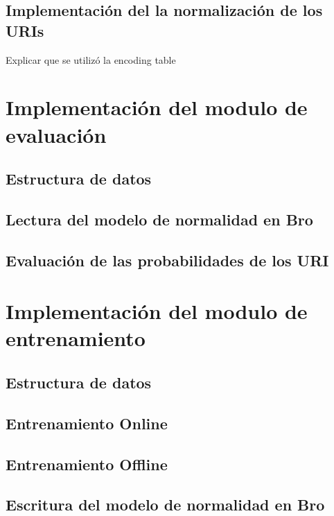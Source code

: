 \subsection{Implementación del la normalización de los URIs}
Explicar que se utilizó la encoding table
\section{Implementación del modulo de evaluación}
\subsection{Estructura de datos}
\subsection{Lectura del modelo de normalidad en Bro}
\subsection{Evaluación de las probabilidades de los URI}
\section{Implementación del modulo de entrenamiento}
\subsection{Estructura de datos}
\subsection{Entrenamiento Online}
\subsection{Entrenamiento Offline}
\subsection{Escritura del modelo de normalidad en Bro}